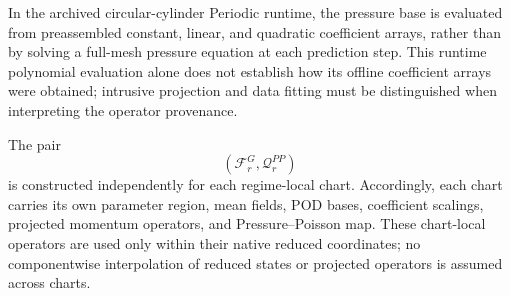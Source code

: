 In the archived circular-cylinder Periodic runtime, the pressure base is evaluated from preassembled constant, linear, and quadratic coefficient arrays, rather than by solving a full-mesh pressure equation at each prediction step. This runtime polynomial evaluation alone does not establish how its offline coefficient arrays were obtained; intrusive projection and data fitting must be distinguished when interpreting the operator provenance.

The pair
\begin{equation}
    \left(
        \mathcal F_r^G,
        \mathcal Q_r^{PP}
    \right)
\end{equation}
is constructed independently for each regime-local chart.
Accordingly, each chart carries its own parameter region, mean fields,
POD bases, coefficient scalings, projected momentum operators, and
Pressure--Poisson map.
These chart-local operators are used only within their native reduced
coordinates; no componentwise interpolation of reduced states or projected
operators is assumed across charts.

